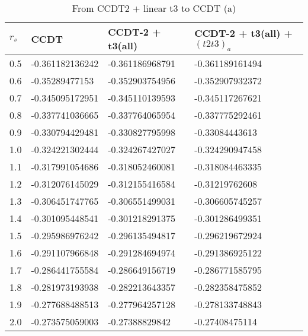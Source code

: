 \begin{table}[h]
\caption{From CCDT2 + linear t3 to CCDT (a)}
\begin{center}
\begin{threeparttable}
\begin{tabular}{l l l l}
    \toprule
$r_s$ & CCDT & CCDT-2 + t3(all) & CCDT-2 + t3(all) + $(t2t3)_a$  \\ \hline
0.5 & -0.361182136242 & -0.361186968791 & -0.361189161494   \\
0.6 & -0.35289477153 & -0.352903754956 & -0.352907932372   \\
0.7 & -0.345095172951 & -0.345110139593 & -0.345117267621   \\
0.8 & -0.337741036665 & -0.337764065954 & -0.337775292461  \\
0.9 & -0.330794429481 & -0.330827795998 & -0.33084443613   \\
1.0 & -0.324221302444 & -0.324267427027 & -0.324290947458   \\
1.1 & -0.317991054686 & -0.318052460081 & -0.318084463335   \\
1.2 & -0.312076145029 & -0.312155416584 & -0.31219762608   \\
1.3 & -0.306451747765 & -0.306551499031 & -0.306605745257   \\
1.4 & -0.301095448541 & -0.301218291375 & -0.301286499351   \\
1.5 & -0.295986976242 & -0.296135494817 & -0.296219672924   \\
1.6 & -0.291107966848 & -0.291284694974 & -0.291386925122   \\
1.7 & -0.286441755584 & -0.286649156719 & -0.286771585795   \\
1.8 & -0.281973193938 & -0.282213643357 & -0.282358475852   \\
1.9 & -0.277688488513 & -0.277964257128 & -0.278133748843   \\
2.0 & -0.273575059003 & -0.27388829842 & -0.27408475114   \\
\bottomrule
\end{tabular}
\begin{tablenotes}
\end{tablenotes}
\end{threeparttable}
\end{center}
\label{tab:ccdt3_to_ccdt_1}
\end{table}

